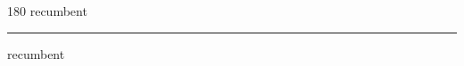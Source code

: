 
\begin{frame}
\begin{center}
\begin{turn}{180}
{\fontsize{2.5cm}{1em}\selectfont recumbent}
\end{turn}
\vspace{1em}\par  
\hrule
\vspace{1em}\par  
{\fontsize{2.5cm}{1em}\selectfont recumbent}
\end{center}
\end{frame}
